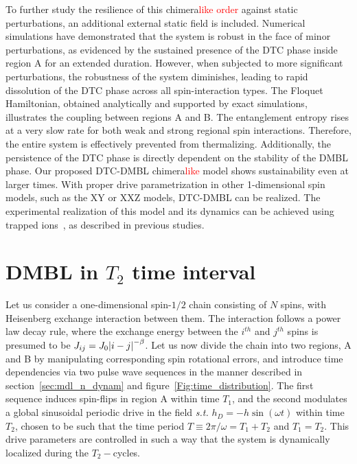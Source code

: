 \documentclass[12pt]{iopart}
\newcommand{\red}[1]{\textcolor{red}{#1}}
\begin{document}
To further study the resilience of this chimera\red{like order} against static perturbations, an additional external static field is included. Numerical simulations have demonstrated that the system is robust in the face of minor perturbations, as evidenced by the sustained presence of the DTC phase inside region A for an extended duration. However, when subjected to more significant perturbations, the robustness of the system diminishes, leading to rapid dissolution of the DTC phase across all spin-interaction types. The Floquet Hamiltonian, obtained analytically and supported by exact simulations, illustrates the coupling between regions A and B. The entanglement entropy rises at a very slow rate for both weak and strong regional spin interactions. Therefore, the entire system is effectively prevented from thermalizing. Additionally, the persistence of the DTC phase is directly dependent on the stability of the DMBL phase. Our proposed DTC-DMBL chimera\red{like} model shows sustainability even at larger times.  With proper drive parametrization in other 1-dimensional spin models, such as the XY or XXZ models, DTC-DMBL can be realized. The experimental realization of this model and its dynamics can be achieved using trapped ions~\cite{sakurai_phys_nodate, Friedenauer2008}, as described in previous studies.
	
\medskip

\clearpage

\appendix
\section{\label{sec:AppendixA} DMBL in $T_2$ time interval}

Let us consider a one-dimensional spin-$1/2$ chain consisting of $N$ spins, with Heisenberg exchange interaction between them. The interaction follows a power law decay rule, where the exchange energy between the $i^{th}$ and $j^{th}$ spins is presumed to be  $J_{ij}=J_0\abs{i-j}^{-\beta}$. Let us now  divide the chain into two regions, A and B by manipulating corresponding spin rotational errors, and introduce time dependencies via two pulse wave sequences in the manner described in section~\ref{sec:mdl_n_dynam} and figure~\ref{Fig:time_distribution}. The first sequence  induces spin-flips in region A within time $T_1$, and the second modulates a global sinusoidal periodic drive in the field \textit{s.t.} $h_D = -h\sin(\omega t)$ within time $T_2$, chosen to be such that the time period $T\equiv 2\pi/\omega = T_1 + T_2$ and $T_1 = T_2$. This drive parameters are controlled in such a way that the system is dynamically localized during the $T_2-$cycles.
\end{document}
